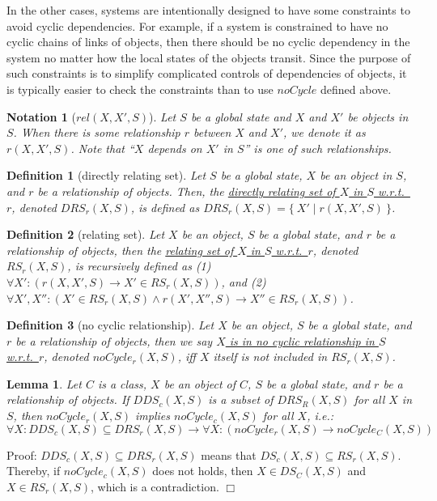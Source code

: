 \documentclass[12pt]{report}
\newtheorem{lemma}{Lemma}
\newtheorem{notation}{Notation}
\newtheorem{definition}{Definition}
\newcommand{\ra}{\rightarrow}
\newcommand{\ul}{\underline}
\begin{document}
In the other cases, systems are intentionally designed to have some constraints
to avoid cyclic dependencies. For example, if a system is constrained to
have no cyclic chains of links of objects, then there should be no
cyclic dependency in the system no matter how the local states of the
objects transit. Since the purpose of such constraints is to simplify
complicated controls of dependencies of objects, it is typically easier
to check the constraints than to use $noCycle$ defined above.

\begin{notation}[$rel(X,X',S)$]
  Let $S$ be a global state and $X$ and $X'$ be objects in $S$.  When
  there is some relationship $r$ between $X$ and $X'$, we denote it
  as \ul{$r(X,X',S)$}. Note that ``$X$ depends on $X'$ in $S$'' is one
  of such relationships.
\end{notation}

\begin{definition}[directly relating set]
Let $S$ be a global state, $X$ be an object in $S$, and $r$ be a
relationship of objects. Then, the \ul{directly relating set of $X$ in
  $S$ w.r.t.\ $r$}, denoted \ul{$DRS\!_r(X,S)$}, is defined as
$DRS\!_r(X,S)=\{~X'\mid r(X,X',S)~\}$.
\end{definition}

\begin{definition}[relating set]
Let $X$ be an object, $S$ be a global state, and $r$ be a relationship
of objects, then the \ul{relating set of $X$ in $S$
  w.r.t.\ $r$}, denoted \ul{$RS\!_r(X,S)$}, is recursively defined
as (1) $\forall X': (r(X,X',S) \ra X'\in RS\!_r(X,S))$, and (2)
$\forall X',X'': (X'\in RS\!_r(X,S) \land r(X',X'',S) \ra X''\in
RS\!_r(X,S))$.
\end{definition}

\begin{definition}[no cyclic relationship]
Let $X$ be an object, $S$ be a global state, and $r$ be a relationship
of objects, then we say \ul{$X$ is in no cyclic relationship in $S$
  w.r.t.\ $r$}, denoted \ul{$noCycle_r(X,S)$}, iff $X$ itself is not
included in $RS\!_r(X,S)$.
\end{definition}

\begin{lemma}
\label{lemma:simplerel}
Let $C$ is a class, $X$ be an object of $C$, $S$ be a global state,
and $r$ be a relationship of objects. If $DDS\!_c(X,S)$ is a subset of
$DRS\!_R(X,S)$ for all $X$ in $S$, then $noCycle_r(X,S)$ implies
$noCycle_c(X,S)$ for all $X$, i.e.:
\[\forall X:DDS\!_c(X,S)\subseteq DRS\!_r(X,S) \ra \forall X: (noCycle_r(X,S) \ra
noCycle_C(X,S))\]
\end{lemma}
Proof: $DDS\!_c(X,S)\subseteq DRS\!_r(X,S)$ means that $DS\!_c(X,S)\subseteq
RS\!_r(X,S)$.  Thereby, if $noCycle_c(X,S)$ does not holds, then $X\in
DS\!_C(X,S)$ and $X\in RS\!_r(X,S)$, which is a contradiction. $\Box$\\
\end{document}

